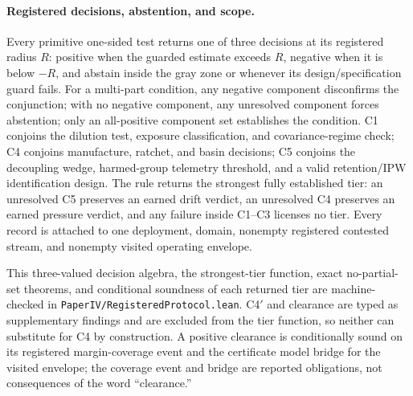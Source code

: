 \documentclass[11pt]{article}
\theoremstyle{definition}
\theoremstyle{remark}
\numberwithin{equation}{section}
\begin{document}
\paragraph{Registered decisions, abstention, and scope.} Every primitive
one-sided test returns one of three decisions at its registered radius $R$:
positive when the guarded estimate exceeds $R$, negative when it is below
$-R$, and abstain inside the gray zone or whenever its design/specification
guard fails. For a multi-part condition, any negative component disconfirms
the conjunction; with no negative component, any unresolved component forces
abstention; only an all-positive component set establishes the condition. C1
conjoins the dilution test, exposure classification, and covariance-regime
check; C4 conjoins manufacture, ratchet, and basin decisions; C5 conjoins the
decoupling wedge, harmed-group telemetry threshold, and a valid retention/IPW
identification design. The rule returns the strongest fully established tier:
an unresolved C5 preserves an earned drift verdict, an unresolved C4 preserves
an earned pressure verdict, and any failure inside C1--C3 licenses no tier.
Every record is attached to one deployment, domain, nonempty registered
contested stream, and nonempty visited operating envelope.

This three-valued decision algebra, the strongest-tier function, exact
no-partial-set theorems, and conditional soundness of each returned tier are
machine-checked in \texttt{PaperIV/}\allowbreak\texttt{Registered}\allowbreak\texttt{Protocol.lean}. C4$'$ and
clearance are typed as supplementary findings and are excluded from the tier
function, so neither can substitute for C4 by construction. A positive
clearance is conditionally sound on its registered margin-coverage event and
the certificate model bridge for the visited envelope; the coverage event and
bridge are reported obligations, not consequences of the word
``clearance.''
\end{document}
